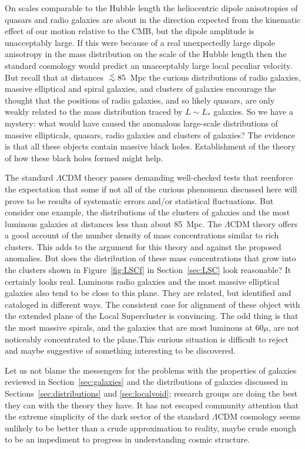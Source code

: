 \documentclass[fleqn,usenatbib]{mnras}
\def\lap{\lower.5ex\hbox{$\; \buildrel < \over \sim \;$}}
\begin{document}
On scales comparable to the Hubble length the heliocentric dipole anisotropies of quasars and radio galaxies are about in the direction expected from the kinematic effect of our motion relative to the CMB, but the dipole amplitude is unacceptably large. If this were because of a real unexpectedly large dipole anisotropy in the mass distribution on the scale of the Hubble length then the standard cosmology would predict an unacceptably large local peculiar velocity. But recall that at distances $\lap 85$~Mpc the curious distributions of radio galaxies, massive elliptical and spiral galaxies, and clusters of galaxies encourage the thought that the positions of radio galaxies, and so likely quasars, are only weakly related to the mass distribution traced by $L\sim L_\ast$ galaxies. So we have a mystery: what would have caused the anomalous large-scale distributions of massive ellipticals, quasars, radio galaxies and clusters of galaxies? The evidence is that all these objects contain massive black holes. Establishment of the theory of how these black holes formed might help. 

The standard $\Lambda$CDM theory passes demanding well-checked tests that reenforce the expectation that some if not all of the curious phenomena discussed here will prove to be results of systematic errors and/or statistical fluctuations. But consider one example, the distributions of the clusters of galaxies and the most luminous galaxies at distances less than about 85~Mpc. The $\Lambda$CDM theory offers a good account of the number density of mass concentrations similar to rich clusters. This adds to the argument for this theory and against the proposed anomalies. But does the distribution of these mass concentrations that grow into the clusters shown in  Figure~\ref{fig:LSCf} in Section~\ref{sec:LSC} look reasonable? It certainly looks real. Luminous radio galaxies and the most massive elliptical galaxies also tend to be close to this plane. They are related, but identified  and cataloged in different ways. The consistent case for alignment of these object with the extended plane of the Local Supercluster is convincing. The odd thing is that the most massive spirals, and the galaxies that are most luminous at $60\mu$, are not noticeably concentrated to the plane.This curious situation is difficult to reject and maybe suggestive of something interesting to be discovered.

 Let us not blame the messengers for the problems with the properties of galaxies reviewed in Section~\ref{sec:galaxies} and the distributions of galaxies discussed in Sections~\ref{sec:distributions} and \ref{sec:localvoid}; research groups are doing the best they can with the theory they have. It has not escaped community attention that the extreme simplicity of the dark sector of the standard $\Lambda$CDM cosmology seems unlikely to be better than a crude approximation to reality, maybe crude enough to be an impediment to progress in understanding cosmic structure.
 
\end{document}
